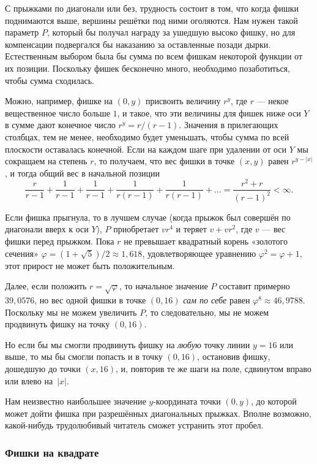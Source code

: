 \medskip

С прыжками по диагонали или без, трудность состоит в том, что когда фишки поднимаются выше, вершины решётки под ними оголяются.
Нам нужен такой параметр $P$, который бы получал награду за ушедшую высоко фишку, но для компенсации подвергался бы наказанию за оставленные позади дырки.
Естественным выбором была бы сумма по всем фишкам некоторой функции от их позиции.
Поскольку фишек бесконечно много, необходимо позаботиться, чтобы сумма сходилась.

Можно, например, фишке на $(0, y)$ присвоить величину $r^y$, где $r$ --- некое вещественное число больше $1$, и такое, что эти величины для фишек ниже оси $Y$ в сумме дают конечное число $r^y = r / (r-1)$.
Значения в прилегающих столбцах, тем не менее, необходимо будет уменьшать, чтобы сумма по всей плоскости оставалась конечной.
Если на каждом шаге при удалении от оси $Y$ мы сокращаем на степень $r$, то получаем, что вес фишки в точке $(x, y)$ равен $r^{y - |x|}$, и тогда общий вес в начальной позиции 
\[\frac r{r-1} + \frac 1{r-1} +\frac 1{r-1} +\frac 1{r(r-1)} +\frac 1{r(r-1)} + \dots =\frac{r^2+r}{(r-1)^2} <\infty .\]

Если фишка прыгнула, то в лучшем случае (когда прыжок был совершён по диагонали вверх к оси $Y$), $P$ приобретает $vr^4$ и теряет $v+vr^2$, где $v$ --- вес фишки перед прыжком.
Пока $r$ не превышает квадратный корень «золотого сечения» $\varphi=(1+\sqrt5)/2\approx 1{,}618$, удовлетворяющее уравнению $\varphi^2=\varphi+1$, этот прирост не может быть положительным.

Далее, если положить $r = \sqrt{\varphi}$, то начальное значение $P$ составит примерно $39{,}0576$, но вес одной фишки в точке $(0, 16)$ \emph{сам по себе} равен $\varphi^8\approx 46{,}9788$.
Поскольку мы не можем увеличить $P$, то следовательно, мы не можем продвинуть фишку на точку $(0, 16)$.

Но если бы мы смогли продвинуть фишку на \emph{любую} точку линии $y = 16$ или выше, то мы бы смогли попасть и в точку $(0, 16)$, остановив фишку, дошедшую до точки $(x, 16)$, и, повторив те же шаги на поле, сдвинутом вправо или влево на~$|x|$.
\heart

Нам неизвестно наибольшее значение $y$-координата точки $(0, y)$, до которой может дойти фишка при разрешённых диагональных прыжках.
Вполне возможно, какой-нибудь трудолюбивый читатель сможет устранить этот пробел.

\subsubsection*{Фишки на квадрате}%


